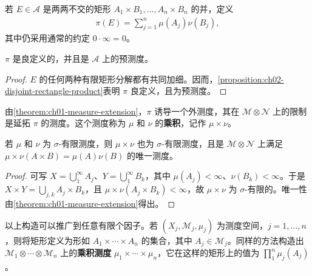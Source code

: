 \documentclass[../../main.tex]{subfiles}%
\begin{document}
\begin{definition}[矩形代数上的预测度]\label{definition:ch02-product-premeasure}
若 $E\in\mathscr{A}$ 是两两不交的矩形 $A_1\times B_1,\ldots,A_n\times B_n$ 的并，定义
\begin{align*}
\pi(E)=\sum_{j=1}^n\mu(A_j)\nu(B_j),
\end{align*}
其中仍采用通常的约定 $0\cdot\infty=0$。
\end{definition}
\begin{proposition}\label{proposition:ch02-product-premeasure-well-defined}
$\pi$ 是良定义的，并且是 $\mathscr{A}$ 上的预测度。
\end{proposition}
\begin{proof}
$E$ 的任何两种有限矩形分解都有共同加细。因而，\cref{proposition:ch02-disjoint-rectangle-product}表明 $\pi$ 良定义，且为预测度。
\end{proof}
\begin{definition}[乘积测度]\label{definition:ch02-product-measure}
由\cref{theorem:ch01-measure-extension}，$\pi$ 诱导一个外测度，其在 $\mathscr{M}\otimes\mathscr{N}$ 上的限制是延拓 $\pi$ 的测度。这个测度称为 $\mu$ 和 $\nu$ 的\textbf{乘积}，记作 $\mu\times\nu$。
\end{definition}
\begin{proposition}\label{proposition:ch02-product-sigma-finite-unique}
若 $\mu$ 和 $\nu$ 为 $\sigma$-有限测度，则 $\mu\times\nu$ 也为 $\sigma$-有限测度，且是 $\mathscr{M}\otimes\mathscr{N}$ 上满足 $\mu\times\nu(A\times B)=\mu(A)\nu(B)$ 的唯一测度。
\end{proposition}
\begin{proof}
可写 $X=\bigcup_1^\infty A_j$、$Y=\bigcup_1^\infty B_k$，其中 $\mu(A_j)<\infty$、$\nu(B_k)<\infty$。于是 $X\times Y=\bigcup_{j,k}A_j\times B_k$，且 $\mu\times\nu(A_j\times B_k)<\infty$，故 $\mu\times\nu$ 为 $\sigma$-有限的。唯一性由\cref{theorem:ch01-measure-extension}得出。
\end{proof}
\begin{definition}[有限个测度的乘积]\label{definition:ch02-finite-product-measure}
以上构造可以推广到任意有限个因子。若 $(X_j,\mathscr{M}_j,\mu_j)$ 为测度空间，$j=1,\ldots,n$，则将矩形定义为形如 $A_1\times\cdots\times A_n$ 的集合，其中 $A_j\in\mathscr{M}_j$。同样的方法构造出 $\mathscr{M}_1\otimes\cdots\otimes\mathscr{M}_n$ 上的\textbf{乘积测度} $\mu_1\times\cdots\times\mu_n$，它在这样的矩形上的值为 $\prod_1^n\mu_j(A_j)$。
\end{definition}
\end{document}
